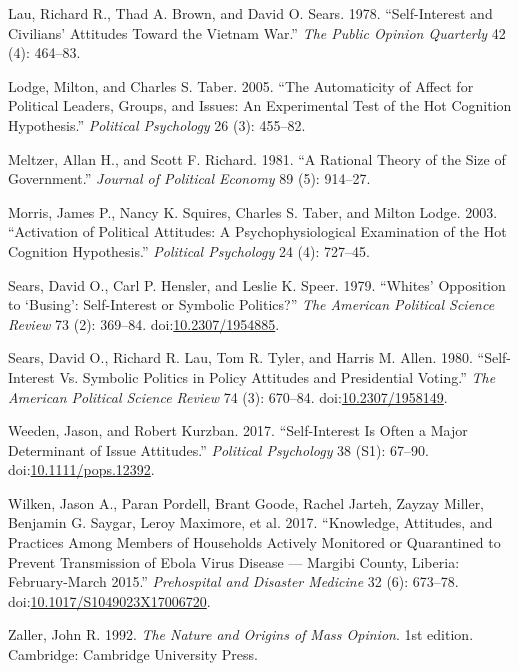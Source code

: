\documentclass[]{article}
\begin{document}
\hypertarget{ref-lau_self-interest_1978}{}
Lau, Richard R., Thad A. Brown, and David O. Sears. 1978.
``Self-Interest and Civilians' Attitudes Toward the Vietnam War.''
\emph{The Public Opinion Quarterly} 42 (4): 464--83.

\hypertarget{ref-lodge_automaticity_2005}{}
Lodge, Milton, and Charles S. Taber. 2005. ``The Automaticity of Affect
for Political Leaders, Groups, and Issues: An Experimental Test of the
Hot Cognition Hypothesis.'' \emph{Political Psychology} 26 (3): 455--82.

\hypertarget{ref-meltzer_rational_1981}{}
Meltzer, Allan H., and Scott F. Richard. 1981. ``A Rational Theory of
the Size of Government.'' \emph{Journal of Political Economy} 89 (5):
914--27.

\hypertarget{ref-morris_activation_2003}{}
Morris, James P., Nancy K. Squires, Charles S. Taber, and Milton Lodge.
2003. ``Activation of Political Attitudes: A Psychophysiological
Examination of the Hot Cognition Hypothesis.'' \emph{Political
Psychology} 24 (4): 727--45.

\hypertarget{ref-sears_whites_1979}{}
Sears, David O., Carl P. Hensler, and Leslie K. Speer. 1979. ``Whites'
Opposition to `Busing': Self-Interest or Symbolic Politics?'' \emph{The
American Political Science Review} 73 (2): 369--84.
doi:\href{https://doi.org/10.2307/1954885}{10.2307/1954885}.

\hypertarget{ref-sears_self-interest_1980}{}
Sears, David O., Richard R. Lau, Tom R. Tyler, and Harris M. Allen.
1980. ``Self-Interest Vs. Symbolic Politics in Policy Attitudes and
Presidential Voting.'' \emph{The American Political Science Review} 74
(3): 670--84.
doi:\href{https://doi.org/10.2307/1958149}{10.2307/1958149}.

\hypertarget{ref-weeden_self-interest_2017}{}
Weeden, Jason, and Robert Kurzban. 2017. ``Self-Interest Is Often a
Major Determinant of Issue Attitudes.'' \emph{Political Psychology} 38
(S1): 67--90.
doi:\href{https://doi.org/10.1111/pops.12392}{10.1111/pops.12392}.

\hypertarget{ref-wilken_knowledge_2017}{}
Wilken, Jason A., Paran Pordell, Brant Goode, Rachel Jarteh, Zayzay
Miller, Benjamin G. Saygar, Leroy Maximore, et al. 2017. ``Knowledge,
Attitudes, and Practices Among Members of Households Actively Monitored
or Quarantined to Prevent Transmission of Ebola Virus Disease ---
Margibi County, Liberia: February-March 2015.'' \emph{Prehospital and
Disaster Medicine} 32 (6): 673--78.
doi:\href{https://doi.org/10.1017/S1049023X17006720}{10.1017/S1049023X17006720}.

\hypertarget{ref-zaller_nature_1992}{}
Zaller, John R. 1992. \emph{The Nature and Origins of Mass Opinion}. 1st
edition. Cambridge: Cambridge University Press.
\end{document}
